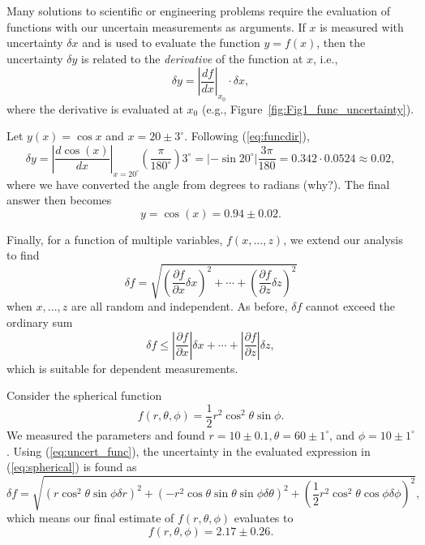 Many solutions to scientific or engineering problems require the evaluation of functions
with our uncertain measurements as arguments.
If $x$ is measured with uncertainty $\delta x$ and is used to evaluate the function $y = f(x)$, then the 
uncertainty $\delta y$ is related to the \emph{derivative} of the function at $x$, i.e.,
\begin{equation}
\delta y = \left | \frac{df}{dx}  \right |_{x_0} \cdot \delta x,
\label{eq:funcdir}
\end{equation}
where the derivative is evaluated at $x_0$ (e.g., Figure~\ref{fig:Fig1_func_uncertainty}).
\begin{example}
Let  $y(x) = \cos x$ and $x = 20 \pm 3^{\circ}$.  Following (\ref{eq:funcdir}),
\begin{equation}
\delta y = \left| \frac{d\cos (x)}{dx} \right |_{x=20^{\circ}} \left( \frac{\pi}{180^{\circ}}\right) 3^{\circ} = \left|-\sin 20^{\circ} \right| 
\frac{3\pi}{180} = 0.342 \cdot 0.0524 \approx 0.02,
\end{equation}	 
where we have converted the angle from degrees to radians (why?).  The final answer then becomes
\begin{equation}
y = \cos(x) = 0.94 \pm 0.02.
\end{equation}
\end{example}
Finally, for a function of multiple variables, $f(x,...,z)$, we extend our analysis to find
\begin{equation}
\delta f = \sqrt{ \left ( \frac{\partial f }{\partial x} \delta x \right) ^2 + \cdots +
\left( \frac{\partial f }{\partial z} \delta z  \right)^2 }
\label{eq:uncert_func}
\end{equation}
when $x,..., z$ are all random and independent.  As before, $\delta f$ cannot exceed the ordinary sum
\begin{equation}
\delta f \leq \left | \frac{\partial f}{\partial x} \right | \delta x + \cdots + 
\left | \frac{\partial f}{\partial z}\right | \delta z,
\end{equation}
which is suitable for dependent measurements.
\begin{example}
Consider the spherical function
\begin{equation}
f (r,\theta, \phi ) = \frac{1}{2} r^2 \cos^2 \theta \sin \phi.	 \label{eq:spherical}	\end{equation}
We measured the parameters and found $r = 10 \pm 0.1, \theta = 60 \pm 1^{\circ}$, and 
$\phi = 10 \pm 1^{\circ}$.  Using (\ref{eq:uncert_func}), the 
uncertainty in the evaluated expression in (\ref{eq:spherical}) is found as
\begin{equation}
\delta f = \sqrt{ (r \cos ^2 \theta \sin \phi \delta r )^2 + 
(-r^2 \cos \theta \sin \theta\sin \phi \delta \theta )^2 + 
\left( \frac{1}{2} r^2 \cos^2 \theta \cos \phi \delta \phi\right )^2},
\end{equation}
which means our final estimate of $f(r, \theta, \phi)$ evaluates to
\begin{equation}
f(r, \theta, \phi) = 2.17 \pm 0.26.
\end{equation}
\end{example}
